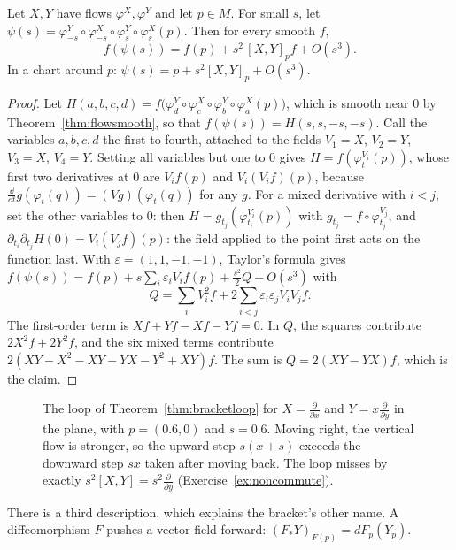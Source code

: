 \begin{theorem}\label{thm:bracketloop}
Let $X,Y$ have flows $\varphi^X,\varphi^Y$ and let $p\in M$. For small $s$, let
$\psi(s)=\varphi^Y_{-s}\circ\varphi^X_{-s}\circ\varphi^Y_s\circ\varphi^X_s(p)$. Then for every smooth $f$,
\[
f(\psi(s))=f(p)+s^2\,[X,Y]_pf+O(s^3).
\]
In a chart around $p$: $\psi(s)=p+s^2[X,Y]_p+O(s^3)$.
\end{theorem}
\begin{proof}
Let $H(a,b,c,d)=f\bigl(\varphi^Y_d\circ\varphi^X_c\circ\varphi^Y_b\circ\varphi^X_a(p)\bigr)$, which is smooth near $0$ by Theorem~\ref{thm:flowsmooth}, so that
$f(\psi(s))=H(s,s,-s,-s)$. Call the variables $a,b,c,d$ the first to fourth, attached to the fields $V_1=X$, $V_2=Y$, $V_3=X$, $V_4=Y$. Setting all
variables but one to $0$ gives $H=f(\varphi^{V_i}_t(p))$, whose first two derivatives at $0$ are $V_if(p)$ and $V_i(V_if)(p)$, because
$\frac{\dd}{\dd t}g(\varphi_t(q))=(Vg)(\varphi_t(q))$ for any $g$. For a mixed derivative with $i<j$, set the other variables to $0$: then
$H=g_{t_j}(\varphi^{V_i}_{t_i}(p))$ with $g_{t_j}=f\circ\varphi^{V_j}_{t_j}$, and $\partial_{t_i}\partial_{t_j}H(0)=V_i(V_jf)(p)$: the field applied to the point
first acts on the function last. With $\varepsilon=(1,1,-1,-1)$, Taylor's formula gives $f(\psi(s))=f(p)+s\sum_i\varepsilon_iV_if(p)+\frac{s^2}2Q+O(s^3)$
with
\[
Q=\sum_iV_i^2f+2\sum_{i<j}\varepsilon_i\varepsilon_jV_iV_jf.
\]
The first-order term is $Xf+Yf-Xf-Yf=0$. In $Q$, the squares contribute $2X^2f+2Y^2f$, and the six mixed terms contribute
$2(XY-X^2-XY-YX-Y^2+XY)f$. The sum is $Q=2(XY-YX)f$, which is the claim.
\end{proof}

\begin{figure}[ht]
\centering
{}
\caption{The loop of Theorem~\ref{thm:bracketloop} for $X=\frac\partial{\partial x}$ and $Y=x\frac\partial{\partial y}$ in the plane, with $p=(0.6,0)$ and $s=0.6$.
Moving right, the vertical flow is stronger, so the upward step $s(x+s)$ exceeds the downward step $sx$ taken after moving back. The loop misses by
exactly $s^2[X,Y]=s^2\frac\partial{\partial y}$ (Exercise~\ref{ex:noncommute}).}
\label{fig:bracketloop}
\end{figure}

There is a third description, which explains the bracket's other name. A diffeomorphism $F$ pushes a vector field forward: $(F_*Y)_{F(p)}=dF_p(Y_p)$.

